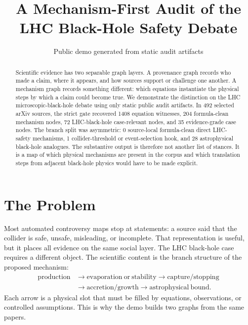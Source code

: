 \documentclass[11pt]{article}
\title{A Mechanism-First Audit of the LHC Black-Hole Safety Debate}
\author{Public demo generated from static audit artifacts}
\date{}
\newcommand{\SelectedSources}{492}
\newcommand{\EquationWitnesses}{1408}
\newcommand{\UsableMechanisms}{204}
\newcommand{\CaseMechanisms}{72}
\newcommand{\EvidenceGradeMechanisms}{35}
\newcommand{\DirectSafetyMechanisms}{0}
\newcommand{\AstroAnalogues}{28}
\newcommand{\ThresholdHooks}{1}
\begin{document}
\sloppy
\maketitle

\begin{abstract}
Scientific evidence has two separable graph layers. A provenance graph records who
made a claim, where it appears, and how sources support or challenge one another.
A mechanism graph records something different: which equations instantiate the
physical steps by which a claim could become true. We demonstrate the distinction
on the LHC microscopic-black-hole debate using only static public audit artifacts.
In \SelectedSources{} selected arXiv sources, the strict gate recovered
\EquationWitnesses{} equation witnesses, \UsableMechanisms{} formula-clean
mechanism nodes, \CaseMechanisms{} LHC-black-hole case-relevant nodes, and
\EvidenceGradeMechanisms{} evidence-grade case nodes. The branch split was
asymmetric: \DirectSafetyMechanisms{} source-local formula-clean direct
LHC-safety mechanisms, \ThresholdHooks{} collider-threshold or event-selection
hook, and \AstroAnalogues{} astrophysical black-hole analogues. The substantive
output is therefore not another list of stances. It is a map of which physical
mechanisms are present in the corpus and which translation steps from adjacent
black-hole physics would have to be made explicit.
\end{abstract}

\section{The Problem}

Most automated controversy maps stop at statements: a source said that the collider
is safe, unsafe, misleading, or incomplete. That representation is useful, but it
places all evidence on the same social layer. The LHC black-hole case requires a
different object. The scientific content is the branch structure of the proposed
mechanism:
\[
\begin{aligned}
\mathrm{production} &\rightarrow \mathrm{evaporation\ or\ stability}
\rightarrow \mathrm{capture/stopping}\\
&\rightarrow \mathrm{accretion/growth}
\rightarrow \mathrm{astrophysical\ bound} .
\end{aligned}
\]
Each arrow is a physical slot that must be filled by equations, observations, or
controlled assumptions. This is why the demo builds two graphs from the same
papers.
\end{document}
